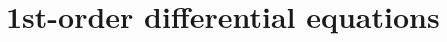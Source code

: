 \documentclass[a4paper]{book} %
\begin{document}
\chapter{1st-order differential equations}

%
%
%
%
%
%
%
%

\end{document}
